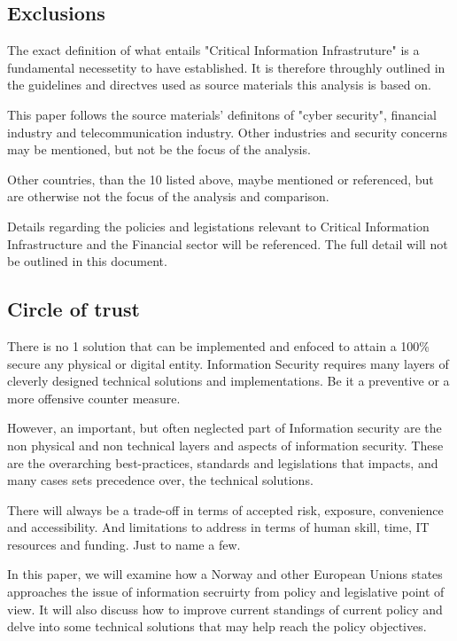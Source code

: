 \subsection{Exclusions}

The exact definition of what entails "Critical Information Infrastruture" is a fundamental necessetity to have established. It is therefore throughly outlined in the guidelines and directves used as source materials this analysis is based on.

This paper follows the source materials' definitons of {\emph{}{"cyber security"}}, financial industry and telecommunication industry. Other industries and security concerns may be mentioned, but not be the focus of the analysis.

Other countries, than the 10 listed above, maybe mentioned or referenced, but are otherwise not the focus of the analysis and comparison.

Details regarding the policies and legistations relevant to Critical Information Infrastructure and the Financial sector will be referenced. The full detail will not be outlined in this document.

\subsection{Circle of trust}

There is no 1 solution that can be implemented and enfoced to attain a 100\% secure any physical or digital entity. Information Security requires many layers of cleverly designed technical solutions and implementations. Be it a preventive or a more offensive counter measure.

However, an important, but often neglected part of Information security are the non physical and non technical layers and aspects of information security. These are the overarching best-practices, standards and legislations that impacts, and many cases sets precedence over, the technical solutions.

There will always be a trade-off in terms of accepted risk, exposure, convenience and accessibility. And limitations to address in terms of human skill, time, IT resources and funding. Just to name a few.

In this paper, we will examine how a Norway and other European Unions states approaches the issue of information secruirty from policy and legislative point of view. It will also discuss how to improve current standings of current policy and delve into some technical solutions that may help reach the policy objectives.